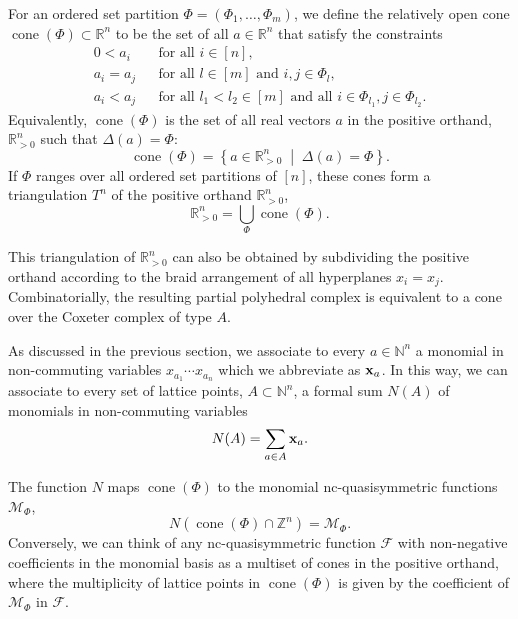 \documentclass[12pt,reqno]{amsart}
\numberwithin{definition}{section}
\theoremstyle{definition}
\newcommand{\RR}{\mathbb{R}}
\newcommand{\NN}{\mathbb{N}}
\newcommand{\ZZ}{\mathbb{Z}}
\newcommand{\SSS}{\mathcal{S}}
\newcommand{\cone}{\operatorname{cone}}
\newcommand{\mset}[2]{ \left\{ #1 \; \middle| \; #2 \right\}}
\newcommand{\ncM}{\mathcal{M}}
\newcommand{\poly}{\chi} %
\newcommand{\comment}[1]{\textsf{\footnotesize #1}}
\begin{document}
For an ordered set partition $\Phi=(\Phi_1,\ldots,\Phi_m)$, we define the relatively open cone $\cone(\Phi)\subset\RR^n$ to be the set of all $a\in\RR^n$ that satisfy the constraints
\begin{eqnarray*}
0 < a_i && \text{for all $i\in[n]$}, \\
a_i = a_j && \text{for all $l\in[m]$ and $i,j\in\Phi_l$}, \\
a_i < a_j && \text{for all $l_1 < l_2\in[m]$ and all $i\in\Phi_{l_1}, j\in\Phi_{l_2}$}.
\end{eqnarray*}
Equivalently, $\cone(\Phi)$ is the set of all real vectors $a$ in the positive orthand, $\RR_{> 0}^n$ such that $\Delta(a)=\Phi$: 
\[
\cone(\Phi) = \mset{a\in\RR_{> 0}^n}{\Delta(a)=\Phi}.
\]
 If $\Phi$ ranges over all ordered set partitions of $[n]$, these cones form a triangulation $T^n$ of the positive orthand $\RR_{> 0}^n$, 
\[
  \RR_{> 0}^n = \bigcup_\Phi \cone(\Phi).
\]


This triangulation of $\RR_{> 0}^n$ can also be obtained by subdividing the positive orthand according to the braid arrangement of all hyperplanes $x_i=x_j$. Combinatorially, the resulting partial polyhedral complex is equivalent to a cone over the Coxeter complex of type $A$. 

As discussed in the previous section, we associate to every $a\in\NN^n$ a monomial in non-commuting variables $x_{a_1}\cdots x_{a_n}$ which we abbreviate as ${\bf x}_a$. In this way, we can associate to every set of lattice points, $A\subset\NN^n$, a formal sum $N(A)$ of monomials in non-commuting variables
\[
  N(A) = \sum_{a\in A} {\bf x}_a.
\]

The function $N$ maps $\cone(\Phi)$ to the monomial nc-quasisymmetric functions $\ncM_\Phi$,
\[
  N(\cone(\Phi)\cap\ZZ^n) = \ncM_\Phi.
\]
Conversely, we can think of any nc-quasisymmetric function $\mathcal{F}$ with non-negative coefficients in the monomial basis as a multiset of cones in the positive orthand, where the multiplicity of lattice points in $\cone(\Phi)$ is given by the coefficient of $\ncM_\Phi$ in $\mathcal{F}$.



\end{document}
